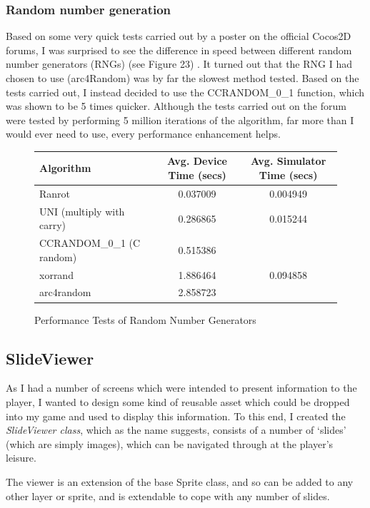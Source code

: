 \documentclass[a4paper,oneside]{report}
\begin{document}
\subsubsection{Random number generation} 

Based on some very quick tests carried out by a poster on the official Cocos2D forums, I was surprised to see the difference in speed between different random number generators (RNGs) (see Figure 23) \cite{:2011zt}. It turned out that the RNG I had chosen to use (arc4Random) was by far the slowest method tested. Based on the tests carried out, I instead decided to use the CCRANDOM\_0\_1 function, which was shown to be 5 times quicker. Although the tests carried out on the forum were tested by performing 5 million iterations of the algorithm, far more than I would ever need to use, every performance enhancement helps.
	
\begin{figure}[h!]
  \centering	
	\begin{tabular}{|l|c|c|}
\hline
Algorithm & Avg. Device Time (secs) & Avg. Simulator Time (secs)\\ \hline
Ranrot & 0.037009 & 0.004949 \\ \hline
UNI (multiply with carry) & 0.286865 & 0.015244 \\ \hline
CCRANDOM\_0\_1 (C random) & 0.515386 &  \\ \hline
xorrand & 1.886464 & 0.094858 \\ \hline
arc4random & 2.858723 &  \\ \hline
\end{tabular}    \caption{Performance Tests of Random Number Generators}
\end{figure}

\subsection{SlideViewer}

As I had a number of screens which were intended to present information to the player, I wanted to design some kind of reusable asset which could be dropped into my game and used to display this information. To this end, I created the \emph{SlideViewer class}, which as the name suggests, consists of a number of `slides' (which are simply images), which can be navigated through at the player's leisure.

The viewer is an extension of the base Sprite class, and so can be added to any other layer or sprite, and is extendable to cope with any number of slides.
		
\end{document}
